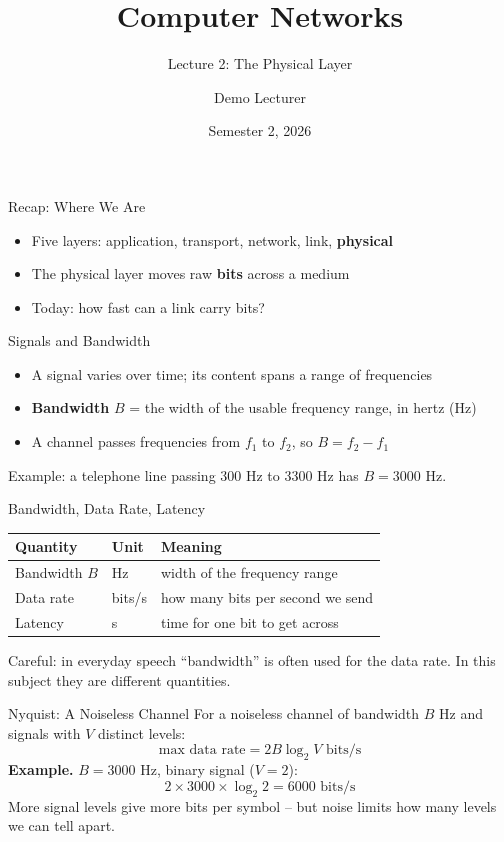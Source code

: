 \documentclass[aspectratio=169,11pt]{beamer}
\title{Computer Networks}
\subtitle{Lecture 2: The Physical Layer}
\author{Demo Lecturer}
\date{Semester 2, 2026}
\begin{document}
\begin{frame}
  \titlepage
\end{frame}
\setcounter{framenumber}{7}

\begin{frame}{Recap: Where We Are}
  \begin{itemize}
    \item Five layers: application, transport, network, link, \textbf{physical}
    \item The physical layer moves raw \textbf{bits} across a medium
    \item Today: how fast can a link carry bits?
  \end{itemize}
\end{frame}

\begin{frame}{Signals and Bandwidth}
  \begin{itemize}
    \item A signal varies over time; its content spans a range of frequencies
    \item \textbf{Bandwidth} $B$ = the width of the usable frequency range, in hertz (Hz)
    \item A channel passes frequencies from $f_1$ to $f_2$, so $B = f_2 - f_1$
  \end{itemize}
  \medskip
  Example: a telephone line passing 300 Hz to 3300 Hz has $B = 3000$ Hz.
\end{frame}

\begin{frame}{Bandwidth, Data Rate, Latency}
  \begin{center}
  \begin{tabular}{lll}
    \hline
    Quantity & Unit & Meaning \\
    \hline
    Bandwidth $B$ & Hz & width of the frequency range \\
    Data rate & bits/s & how many bits per second we send \\
    Latency & s & time for one bit to get across \\
    \hline
  \end{tabular}
  \end{center}
  \medskip
  Careful: in everyday speech ``bandwidth'' is often used for the data rate. In this subject
  they are different quantities.
\end{frame}

\begin{frame}{Nyquist: A Noiseless Channel}
  For a noiseless channel of bandwidth $B$ Hz and signals with $V$ distinct levels:
  \[
    \text{max data rate} = 2B\log_2 V \text{ bits/s}
  \]
  \textbf{Example.} $B = 3000$ Hz, binary signal ($V = 2$):
  \[
    2 \times 3000 \times \log_2 2 = 6000 \text{ bits/s}
  \]
  More signal levels give more bits per symbol -- but noise limits how many levels we can tell apart.
\end{frame}
\end{document}
